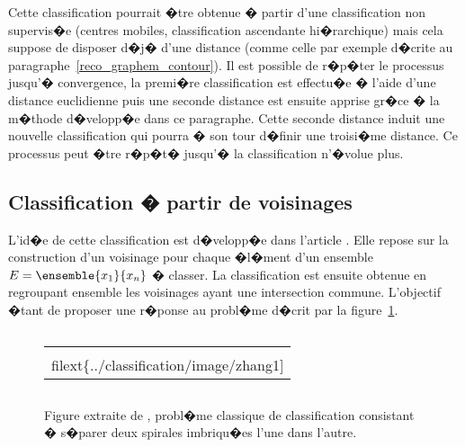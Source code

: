 Cette classification pourrait �tre obtenue � partir d'une classification non supervis�e (centres mobiles, classification ascendante hi�rarchique) mais cela suppose de disposer d�j� d'une distance (comme celle par exemple d�crite au paragraphe~\ref{reco_graphem_contour}). Il est possible de r�p�ter le processus jusqu'� convergence, la premi�re classification est effectu�e � l'aide d'une distance euclidienne puis une seconde distance est ensuite apprise gr�ce � la m�thode d�velopp�e dans ce paragraphe. Cette seconde distance induit une nouvelle classification qui pourra � son tour d�finir une troisi�me distance. Ce processus peut �tre r�p�t� jusqu'� la classification n'�volue plus.













\subsection{Classification � partir de voisinages}
\label{classification_distance_voisinage}



L'id�e de cette classification est d�velopp�e dans l'article . Elle repose sur la construction d'un voisinage pour chaque �l�ment d'un ensemble $E = \ensemble{x_1}{x_n}$ � classer. La classification est ensuite obtenue en regroupant ensemble les voisinages ayant une intersection commune. L'objectif �tant de proposer une r�ponse au probl�me d�crit par la figure~\ref{classification_fig_zhang1}.


        \begin{figure}[ht]
        $$\begin{tabular}{|c|}\hline
        \texttt{[image: \\filext\{../classification/image/zhang1]}}
        \\ \hline \end{tabular}$$
        \caption{    Figure extraite de , probl�me classique de classification consistant
                            � s�parer deux spirales imbriqu�es l'une dans l'autre.}
        \label{classification_fig_zhang1}
        \end{figure}



